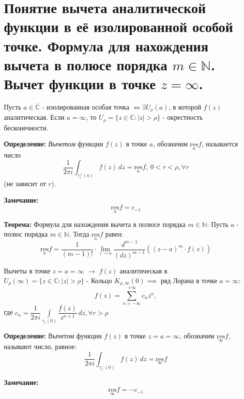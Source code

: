 \section{\texorpdfstring{Понятие вычета аналитической функции в её
изолированной особой точке. Формула для нахождения вычета в полюсе
порядка \(m \in \mathbb{N}\). Вычет функции в точке
\(z=\infty\).}{Понятие вычета аналитической функции в её изолированной особой точке. Формула для нахождения вычета в полюсе порядка m \textbackslash in \textbackslash mathbb\{N\}. Вычет функции в точке z=\textbackslash infty.}}\label{ux43fux43eux43dux44fux442ux438ux435-ux432ux44bux447ux435ux442ux430-ux430ux43dux430ux43bux438ux442ux438ux447ux435ux441ux43aux43eux439-ux444ux443ux43dux43aux446ux438ux438-ux432-ux435ux451-ux438ux437ux43eux43bux438ux440ux43eux432ux430ux43dux43dux43eux439-ux43eux441ux43eux431ux43eux439-ux442ux43eux447ux43aux435.-ux444ux43eux440ux43cux443ux43bux430-ux434ux43bux44f-ux43dux430ux445ux43eux436ux434ux435ux43dux438ux44f-ux432ux44bux447ux435ux442ux430-ux432-ux43fux43eux43bux44eux441ux435-ux43fux43eux440ux44fux434ux43aux430-m-in-mathbbn.-ux432ux44bux447ux435ux442-ux444ux443ux43dux43aux446ux438ux438-ux432-ux442ux43eux447ux43aux435-zinfty.}

Пусть \(a\in \overline{\mathbb{C}}\) - изолированная особая точка
\(\Leftrightarrow \exists \dot{U}_{\rho}(a)\), в которой \(f(z)\)
аналитическая. Если \(a=\infty\), то
\(U_{\rho}=\{ z\in \mathbb{C}:|z|>\rho \}\) - окрестность бесконечности.

\textbf{Определение:} \emph{Вычетом} функции \(f(z)\) в точке \(a\),
обозначим \(\underset{a}{\mathrm{res}} f\), называется число \[
\frac{1}{2\pi i}\int_{\gamma_{r}^{+}(a)}f(z)\,dz=\underset{a}{\mathrm{res}} f, \ 0<r<\rho, \forall r
\] (не зависит от \(r\)).

\textbf{Замечание:} \[
\underset{a}{\mathrm{res}} f=c_{-1}
\]

\textbf{Теорема:} Формула для нахождения вычета в полюсе порядка
\(m\in \mathbb{N}\): Пусть \(a\) - полюс порядка \(m\in \mathbb{N}\).
Тогда \(\underset{a}{\mathrm{res}} f\) равен: \[
\underset{a}{\mathrm{res}}f=  \frac{1}{(m-1)!}\cdot \lim_{ z \to a }  \frac{d^{m-1}}{(dz)^{m-1}}((z-a)^{m}\cdot f(z))
\]

Вычеты в точке \(z=a=\infty\) \(\to\) \(f(z)\) аналитическая в
\(U_{\rho}(\infty)=\{ z\in \mathbb{C}:|z|>\rho \}\) - Кольцо
\(K_{\rho,\infty}(0)\implies\) ряд Лорана в точке \(a=\infty\): \[
f(z)=\sum_{n=-\infty}^{+\infty}c_{n}z^{n},
\] где
\(c_{n}= \dfrac{1}{2\pi i}\int\limits_{\gamma_{r}(0)} \dfrac{f(z)}{z^{n+1}}\,dz, \forall r>\rho\)

\textbf{Определение:} Вычетом функции \(f(z)\) в точке \(z=a=\infty\),
обозначим \(\underset{\infty}{\mathrm{res}}f\), называют число, равное:
\[
\frac{1}{2\pi i}\int_{\gamma_{r}^{-}(0)}f(z)\,dz=\underset{\infty}{\mathrm{res}} f
\]

\textbf{Замечание:} \[
\underset{\infty}{\mathrm{res}} f=-c_{-1}
\]

